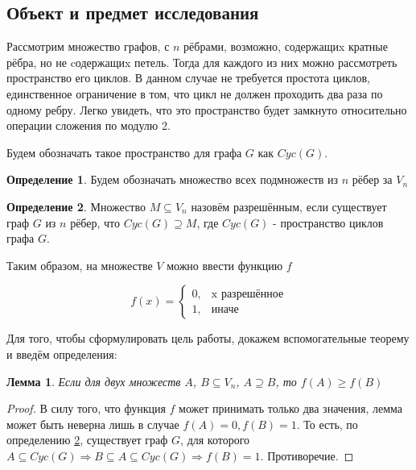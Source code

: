\documentclass[a4paper]{article}
\newtheorem{lemma}[theorem]{Лемма}
\theoremstyle{definition}
\newtheorem{definition}{Определение}[section]
\begin{document}
\subsection{Объект и предмет исследования}

Рассмотрим множество графов, с $n$ рёбрами, возможно, содержащиx кратные рёбра, но не cодержащиx петель. Тогда для каждого из них можно рассмотреть пространство его циклов. В данном случае не требуется простота циклов, единственное ограничение в том, что цикл не должен проходить два раза по одному ребру. Легко увидеть, что это пространство будет замкнуто относительно операции сложения по модулю 2.

Будем обозначать такое пространство для графа $G$ как $Cyc(G)$.

\begin{definition}
	Будем обозначать множество всех подмножеств из $n$ рёбер за $V_n$
\end{definition}



\begin{definition} \label{d1}
	Множество $M \subseteq V_n$ назовём разрешённым, если существует граф $G$ из $n$ рёбер, что $Cyc(G) \supseteq M$, где $Cyc(G)$ - пространство циклов графа $G$.
\end{definition}

Таким образом, на множестве $V$ можно ввести функцию $f$

\begin{equation*}
f(x) = 
\begin{cases}
0, &\text{x разрешённое}\\
1, &\text{иначе}
\end{cases}
\end{equation*}

Для того, чтобы сформулировать цель работы, докажем вспомогательные теорему и введём определения:

\begin{lemma}\label{l1}
	Если для двух множеств $A$, $B \subseteq V_n$, $A \supseteq B$, то $f(A) \ge f(B)$
\end{lemma}

\begin{proof}
	В силу того, что функция $f$ может принимать только два значения, лемма может быть неверна лишь в случае $f(A) = 0, f(B) = 1$. То есть, по определению \ref{d1}, существует граф $G$, для которого $A \subseteq Cyc(G) \Rightarrow B \subseteq A  \subseteq Cyc(G) \Rightarrow f(B) = 1$. Противоречие. 
\end{proof}
\end{document}
